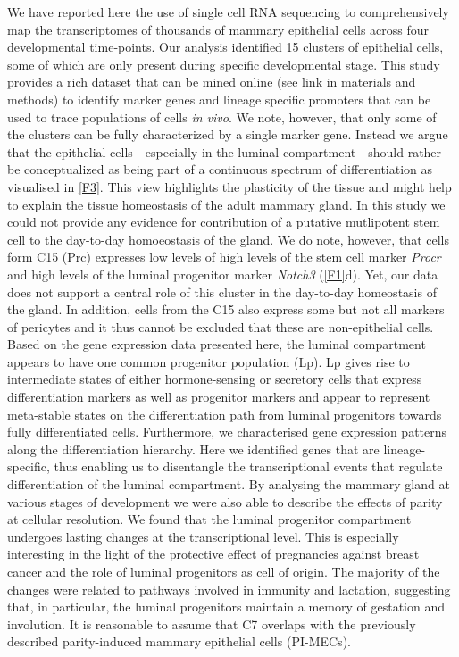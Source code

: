 \documentclass[titlepage, 12pt, oneside]{amsart}
\begin{document}
We have reported here the use of single cell RNA sequencing to comprehensively map the transcriptomes of thousands of mammary epithelial cells across four developmental time-points.
Our analysis identified 15 clusters of epithelial cells, some of which are only present during specific developmental stage.
This study provides a rich dataset that can be mined online (see link in materials and methods) to identify marker genes and lineage specific promoters that can be used to trace populations of cells \textit{in vivo}.
We note, however, that only some of the clusters can be fully characterized by a single marker gene.
Instead we argue that the epithelial cells - especially in the luminal compartment - should rather be conceptualized as being part of a continuous spectrum of differentiation as visualised in \autoref{F3}.
This view highlights the plasticity of the tissue and might help to explain the tissue homeostasis of the adult mammary gland\autocite{Inman2015}.
In this study we could not provide any evidence for contribution of a putative mutlipotent stem cell to the day-to-day homoeostasis of the gland.
We do note, however, that cells form C15 (Prc) expresses low levels of high levels of the stem cell marker \textit{Procr}\autocite{Wang2015} and high levels of the luminal progenitor marker \textit{Notch3}\autocite{Lafkas2013} (\autoref{F1}d).
Yet, our data does not support a central role of this cluster in the day-to-day homeostasis of the gland. 
In addition, cells from the C15 also express some but not all markers of pericytes and it thus cannot be excluded that these are non-epithelial cells. 
Based on the gene expression data presented here, the luminal compartment appears to have one common progenitor population (Lp).
Lp gives rise to intermediate states of either hormone-sensing or secretory cells that express differentiation markers as well as progenitor markers and appear to represent meta-stable states on the differentiation path from luminal progenitors towards fully differentiated cells.
Furthermore, we characterised gene expression patterns along the differentiation hierarchy.
Here we identified genes that are lineage-specific, thus enabling us to disentangle the transcriptional events that regulate differentiation of the luminal compartment.
By analysing the mammary gland at various stages of development we were also able to describe the effects of parity at cellular resolution.
We found that the luminal progenitor compartment undergoes lasting changes at the transcriptional level.
This is especially interesting in the light of the protective effect of pregnancies against breast cancer and the role of luminal progenitors as cell of origin.
The majority of the changes were related to pathways involved in immunity and lactation, suggesting that, in particular, the luminal progenitors maintain a memory of gestation and involution.
It is reasonable to assume that C7 overlaps with the previously described parity-induced mammary epithelial cells (PI-MECs)\autocite{Wagner2002}.
\end{document}

